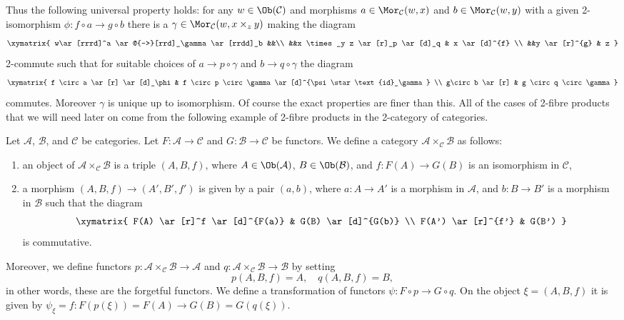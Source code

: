 \noindent
Thus the following universal property holds: for any
$w\in \Ob(\mathcal{C})$ and morphisms
$a \in \Mor_{\mathcal C}(w, x)$ and
$b \in \Mor_\mathcal{C}(w, y)$ with a given 2-isomorphism
$\phi : f \circ a \to g\circ b$
there is a $\gamma \in \Mor_{\mathcal C}(w, x \times_z y)$
making the diagram
$$
\xymatrix{
w\ar[rrrd]^a \ar@{-->}[rrd]_\gamma \ar[rrdd]_b &&\\
&&x \times_y z \ar[r]_p \ar[d]_q & x \ar[d]^{f} \\
&&y \ar[r]^{g} & z }
$$
2-commute such that for suitable choices of
$a \to p \circ \gamma$ and $b \to q \circ \gamma$
the diagram
$$
\xymatrix{
f \circ a \ar[r] \ar[d]_\phi &
f \circ p \circ \gamma
\ar[d]^{\psi \star \text{id}_\gamma}
\\
g\circ b
\ar[r]
&
g \circ q \circ \gamma
}
$$
commutes. Moreover $\gamma$ is unique up to isomorphism.
Of course the exact properties are finer than this. All of the
cases of 2-fibre products that we will need later on come from the following
example of 2-fibre products in the 2-category of categories.

\begin{example}
\label{example-2-fibre-product-categories}
Let $\mathcal{A}$, $\mathcal{B}$, and $\mathcal{C}$ be categories.
Let $F : \mathcal{A} \to \mathcal{C}$ and $G : \mathcal{B} \to \mathcal{C}$
be functors. We define a category
$\mathcal{A} \times_\mathcal{C} \mathcal{B}$ as follows:
\begin{enumerate}
\item an object of $\mathcal{A} \times_\mathcal{C} \mathcal{B}$ is a triple
$(A, B, f)$, where $A\in \Ob(\mathcal{A})$, $B\in \Ob(\mathcal{B})$,
and $f : F(A) \to G(B)$ is an isomorphism in $\mathcal{C}$,
\item a morphism $(A, B, f) \to (A', B', f')$ is given by a pair $(a, b)$, where
$a : A \to A'$ is a morphism in $\mathcal{A}$, and $b : B \to B'$ is a
morphism in $\mathcal{B}$ such that the diagram
$$
\xymatrix{
F(A) \ar[r]^f \ar[d]^{F(a)} & G(B) \ar[d]^{G(b)} \\
F(A') \ar[r]^{f'} & G(B')
}
$$
is commutative.
\end{enumerate}
Moreover, we define functors
$p : \mathcal{A} \times_\mathcal{C}\mathcal{B} \to \mathcal{A}$
and
$q : \mathcal{A} \times_\mathcal{C}\mathcal{B} \to \mathcal{B}$
by setting
$$
p(A, B, f) = A, \quad q(A, B, f) = B,
$$
in other words, these are the forgetful functors.
We define a transformation of functors $\psi : F \circ p \to G \circ q$.
On the object $\xi = (A, B, f)$ it is given by
$\psi_\xi = f : F(p(\xi)) = F(A) \to G(B) = G(q(\xi))$.
\end{example}

